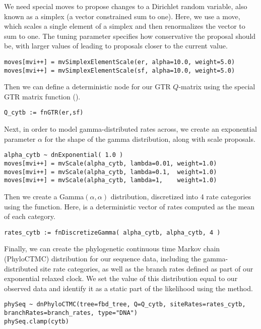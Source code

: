 We need special moves to propose changes to a Dirichlet random variable, also known as a simplex (a vector constrained sum to one).
Here, we use a  move, which scales a single element of a simplex and then renormalizes the vector to sum to one.
The tuning parameter  specifies how conservative the proposal should be, with larger values of  leading to proposals closer to the current value.
{\tt \begin{snugshade*}
\begin{lstlisting}
moves[mvi++] = mvSimplexElementScale(er, alpha=10.0, weight=5.0)
moves[mvi++] = mvSimplexElementScale(sf, alpha=10.0, weight=5.0)
\end{lstlisting}
\end{snugshade*}}

Then we can define a deterministic node for our GTR $Q$-matrix using the special GTR matrix function ().
{\tt \begin{snugshade*}
\begin{lstlisting}
Q_cytb := fnGTR(er,sf)
\end{lstlisting}
\end{snugshade*}}

Next, in order to model gamma-distributed rates across, we create an exponential parameter $\alpha$ for the shape of the gamma distribution, along with scale proposals.
{\tt \begin{snugshade*}
\begin{lstlisting}
alpha_cytb ~ dnExponential( 1.0 )
moves[mvi++] = mvScale(alpha_cytb, lambda=0.01, weight=1.0)
moves[mvi++] = mvScale(alpha_cytb, lambda=0.1,  weight=1.0)
moves[mvi++] = mvScale(alpha_cytb, lambda=1,    weight=1.0)
\end{lstlisting}
\end{snugshade*}}

Then we create a Gamma$(\alpha,\alpha)$ distribution, discretized into 4 rate categories using the  function.
Here,  is a deterministic vector of rates computed as the mean of each category.
{\tt \begin{snugshade*}
\begin{lstlisting}
rates_cytb := fnDiscretizeGamma( alpha_cytb, alpha_cytb, 4 )
\end{lstlisting}
\end{snugshade*}}

Finally, we can create the phylogenetic continuous time Markov chain (PhyloCTMC) distribution for our sequence data, including the gamma-distributed site rate categories, as well as the branch rates defined as part of our exponential relaxed clock.
We set the value of this distribution equal to our observed data and identify it as a static part of the likelihood using the  method.
{\tt \begin{snugshade*}
\begin{lstlisting}
phySeq ~ dnPhyloCTMC(tree=fbd_tree, Q=Q_cytb, siteRates=rates_cytb, branchRates=branch_rates, type="DNA")
phySeq.clamp(cytb)
\end{lstlisting}
\end{snugshade*}}

